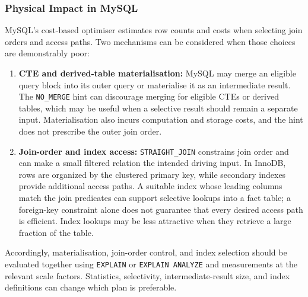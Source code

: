 \documentclass{ULBreport}
\begin{document}
\subsubsection{Physical Impact in MySQL}
MySQL's cost-based optimiser estimates row counts and costs when selecting join orders and access paths. Two mechanisms can be considered when those choices are demonstrably poor:
\begin{enumerate}
    \item \textbf{CTE and derived-table materialisation:} MySQL may merge an eligible query block into its outer query or materialise it as an intermediate result. The \texttt{NO\_MERGE} hint can discourage merging for eligible CTEs or derived tables, which may be useful when a selective result should remain a separate input. Materialisation also incurs computation and storage costs, and the hint does not prescribe the outer join order.
    \item \textbf{Join-order and index access:} \texttt{STRAIGHT\_JOIN} constrains join order and can make a small filtered relation the intended driving input. In InnoDB, rows are organized by the clustered primary key, while secondary indexes provide additional access paths. A suitable index whose leading columns match the join predicates can support selective lookups into a fact table; a foreign-key constraint alone does not guarantee that every desired access path is efficient. Index lookups may be less attractive when they retrieve a large fraction of the table.
\end{enumerate}
Accordingly, materialisation, join-order control, and index selection should be evaluated together using \texttt{EXPLAIN} or \texttt{EXPLAIN ANALYZE} and measurements at the relevant scale factors. Statistics, selectivity, intermediate-result size, and index definitions can change which plan is preferable.
\end{document}
